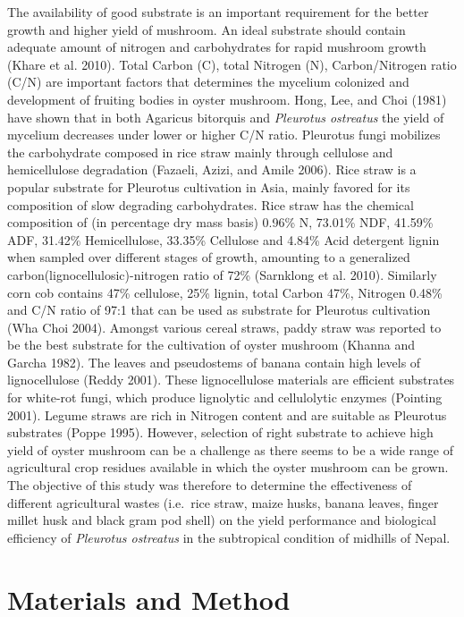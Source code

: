 \documentclass[]{article}
\begin{document}
The availability of good substrate is an important requirement for the better growth and higher yield of mushroom. An ideal substrate should contain adequate amount of nitrogen and carbohydrates for rapid mushroom growth (Khare et al. 2010). Total Carbon (C), total Nitrogen (N), Carbon/Nitrogen ratio (C/N) are important factors that determines the mycelium colonized and development of fruiting bodies in oyster mushroom. Hong, Lee, and Choi (1981) have shown that in both Agaricus bitorquis and \textit{Pleurotus ostreatus} the yield of mycelium decreases under lower or higher C/N ratio. Pleurotus fungi mobilizes the carbohydrate composed in rice straw mainly through cellulose and hemicellulose degradation (Fazaeli, Azizi, and Amile 2006). Rice straw is a popular substrate for Pleurotus cultivation in Asia, mainly favored for its composition of slow degrading carbohydrates. Rice straw has the chemical composition of (in percentage dry mass basis) 0.96\% N, 73.01\% NDF, 41.59\% ADF, 31.42\% Hemicellulose, 33.35\% Cellulose and 4.84\% Acid detergent lignin when sampled over different stages of growth, amounting to a generalized carbon(lignocellulosic)-nitrogen ratio of 72\% (Sarnklong et al. 2010). Similarly corn cob contains 47\% cellulose, 25\% lignin, total Carbon 47\%, Nitrogen 0.48\% and C/N ratio of 97:1 that can be used as substrate for Pleurotus cultivation (Wha Choi 2004). Amongst various cereal straws, paddy straw was reported to be the best substrate for the cultivation of oyster mushroom (Khanna and Garcha 1982). The leaves and pseudostems of banana contain high levels of lignocellulose (Reddy 2001). These lignocellulose materials are efficient substrates for white-rot fungi, which produce lignolytic and cellulolytic enzymes (Pointing 2001). Legume straws are rich in Nitrogen content and are suitable as Pleurotus substrates (Poppe 1995). However, selection of right substrate to achieve high yield of oyster mushroom can be a challenge as there seems to be a wide range of agricultural crop residues available in which the oyster mushroom can be grown. The objective of this study was therefore to determine the effectiveness of different agricultural wastes (i.e.~rice straw, maize husks, banana leaves, finger millet husk and black gram pod shell) on the yield performance and biological efficiency of \textit{Pleurotus ostreatus} in the subtropical condition of midhills of Nepal.

\hypertarget{materials-and-method}{%
\section{Materials and Method}\label{materials-and-method}}
\end{document}
